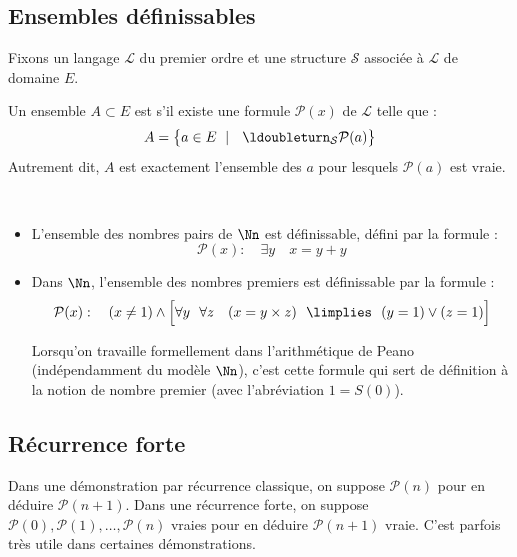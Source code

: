 \documentclass[11pt,class=report,crop=false]{standalone}
\begin{document}
\subsection{Ensembles définissables}

Fixons un langage $\mathcal{L}$ du premier ordre et une structure $\mathcal{S}$ associée à $\mathcal{L}$ de domaine $E$.

\begin{definition}
	Un ensemble $A \subset E$ est  s'il existe une formule $\mathcal{P}(x)$ de $\mathcal{L}$ telle que :
	\[ A = \big\{ a \in E \  \mid \ \ \ldoubleturn_{\mathcal{S}} \mathcal{P}(a) \big\} \]
	Autrement dit, $A$ est exactement l'ensemble des $a$ pour lesquels $\mathcal{P}(a)$ est vraie.
\end{definition}

\begin{exemple}
	~
	\begin{itemize}
		\item L'ensemble des nombres pairs de $\Nn$ est définissable, défini par la formule :
		\[ \mathcal{P}(x) : \quad \exists y \quad x = y+y \]
		
		\item Dans $\Nn$, l'ensemble des nombres premiers est définissable par la formule :
		\[ \mathcal{P}(x) : \quad (x \neq 1) \land \Big[ \forall y \ \ \forall z \quad (x = y \times z) \ \ \limplies \ \ (y = 1) \lor (z = 1) \Big] \]

		Lorsqu'on travaille formellement dans l'arithmétique de Peano (indépendamment du modèle $\Nn$), c'est cette formule qui sert de définition à la notion de nombre premier (avec l'abréviation $1 = S(0)$).
	\end{itemize}
\end{exemple}	



\subsection{Récurrence forte}

Dans une démonstration par récurrence classique, on suppose $\mathcal{P}(n)$ pour en déduire $\mathcal{P}(n+1)$. Dans une récurrence forte, on suppose $\mathcal{P}(0), \mathcal{P}(1), \dots, \mathcal{P}(n)$ vraies pour en déduire $\mathcal{P}(n+1)$ vraie. C'est parfois très utile dans certaines démonstrations.
\end{document}
